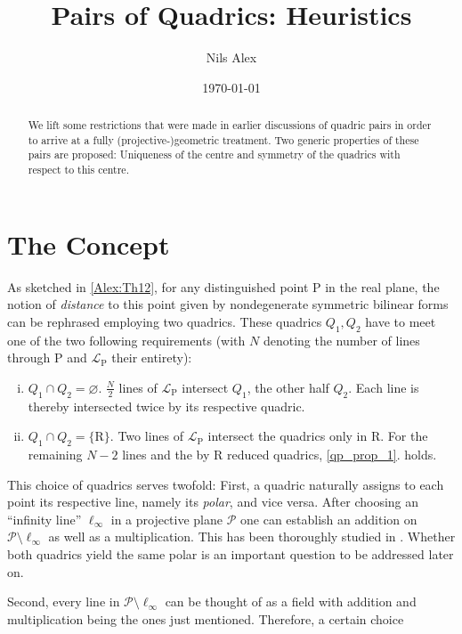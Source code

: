 \documentclass[12pt,english,paper=a4,DIV=12,headings=small,numbers=noenddot,parskip=half]{scrartcl}
\theoremstyle{definition}
\begin{document}
\title{Pairs of Quadrics: Heuristics}
\author{Nils Alex}
\date{\today}

\maketitle

\begin{abstract}
We lift some restrictions that were made in earlier discussions of quadric pairs in order to arrive at a fully (projective-)geometric treatment. Two generic properties of these pairs are proposed: Uniqueness of the centre and symmetry of the quadrics with respect to this centre.
\end{abstract}

\section{The Concept}

As sketched in \ref{Alex:Th12}, for any distinguished point $\mathrm{P}$ in the real plane, the notion of \emph{distance} to this point given by nondegenerate symmetric bilinear forms can be rephrased employing two quadrics. These quadrics $Q_1, Q_2$ have to meet one of the two following requirements (with $N$ denoting the number of lines through $\mathrm{P}$ and $\mathscr{L}_\mathrm{P}$ their entirety):
\begin{enumerate}[i.]
\item{$Q_1 \cap Q_2 = \varnothing$. $\frac{N}{2}$ lines of $\mathscr{L}_\mathrm{P}$ intersect $Q_1$, the other half $Q_2$. Each line is thereby intersected twice by its respective quadric.\label{qp_prop_1}} 
\item{$Q_1 \cap Q_2 = \{ \mathrm{R} \}$. Two lines of $\mathscr{L}_\mathrm{P}$ intersect the quadrics only in $\mathrm{R}$. For the remaining $N-2$ lines and the by $\mathrm{R}$ reduced quadrics, \ref{qp_prop_1}. holds.}
\end{enumerate}

This choice of quadrics serves twofold: First, a quadric naturally assigns to each point its respective line, namely its \emph{polar}, and vice versa. After choosing an ``infinity line'' $\ell_\infty$ in a projective plane $\mathscr{P}$ one can establish an addition on $\mathscr{P}\setminus\ell_\infty$ as well as a multiplication. This has been thoroughly studied in \cite{Beutelspacher}. Whether both quadrics yield the same polar is an important question to be addressed later on. 

Second, every line in $\mathscr{P}\setminus\ell_\infty$ can be thought of as a field with addition and multiplication being the ones just mentioned. Therefore, a certain choice
\end{document}

